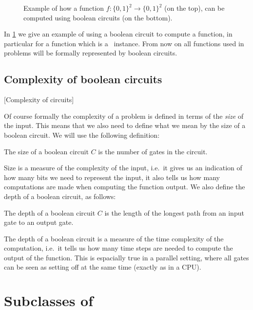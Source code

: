 \begin{figure}
    \centering
    \caption[Computing a function with circuits]{Example of how a function $f : \{0, 1\}^2 \rightarrow \{0, 1\}^2$ (on the top), can be computed using boolean circuits (on the bottom).}
    \label{fig:computing_function_example}
\end{figure}

In \cref{fig:computing_function_example} we give an example of using a boolean circuit to compute a function, in particular for a function which is a \Tarski\ instance. From now on all functions used in problems will be formally represented by boolean circuits.

\subsection{Complexity of boolean circuits}[Complexity of circuits]

Of course formally the complexity of a problem is defined in terms of the \emph{size} of the input. This means that we also need to define what we mean by the size of a boolean circuit. We will use the following definition:

\begin{definition}
    The size of a boolean circuit $C$ is the number of gates in the circuit.
\end{definition}

Size is a measure of the complexity of the input, i.e.\ it gives us an indication of how many bits we need to represent the input, it also tells us how many computations are made when computing the function output. We also define the depth of a boolean circuit, as follows:

\begin{definition}
    The depth of a boolean circuit $C$ is the length of the longest path from an input gate to an output gate.
\end{definition}

The depth of a boolean circuit is a measure of the time complexity of the computation, i.e.\ it tells us how many time steps are needed to compute the output of the function. This is espacially true in a parallel setting, where all gates can be seen as setting off at the same time (exactly as in a CPU).

\section{Subclasses of \TFNP}

